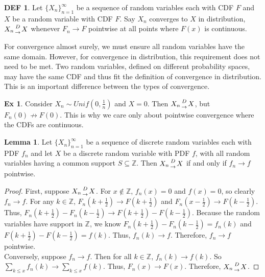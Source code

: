 \documentclass{article}
\theoremstyle{definition}\newtheorem{definition}{DEF}
\theoremstyle{definition}\newtheorem{example}{Ex}
\theoremstyle{lemma}\newtheorem{lemma}{Lemma}
\theoremstyle{corrolary}\newtheorem{corrolary}{Cor}
\begin{document}
\begin{definition}
Let $\{X_n\}_{n=1}^\infty$ be a sequence of random variables each with CDF $F$ and $X$ be a random variable with CDF $F$.
Say $X_n$ converges to $X$ in distribution, $X_n {D \atop \rightarrow} X$ whenever $F_n \rightarrow F$ pointwise at all points where $F(x)$ is continuous.
\end{definition}

For convergence almost surely, we must ensure all random variables have the same domain.
However, for convergence in distribution, this requirement does not need to be met.
Two random variables, defined on different probability spaces, may have the same CDF and thus fit the definition of convergence in distribution.
This is an important difference between the types of convergence.\\

\begin{example}
Consider $X_n \sim Unif(0,\frac{1}{n})$ and $X=0$.
Then $X_n {D\atop \rightarrow} X$, but $F_n(0) \nrightarrow F(0)$.
This is why we care only about pointwise convergence where the CDFs are continuous.
\end{example}

\begin{lemma}
Let $\{X_n \}_{n=1}^\infty$ be a sequence of discrete random variables each with PDF $f_n$ and let $X$ be a discrete random variable with PDF $f$, with all random variables having a common support $S\subseteq \mathbb{Z}$.
Then $X_n {D \atop \rightarrow} X$ if and only if $f_n \rightarrow f$ pointwise.
\end{lemma}
\begin{proof}
First, suppose $X_n {D \atop \rightarrow} X$.
For $x \notin \mathbb{Z}$, $f_n (x)=0$ and $f(x)=0$, so clearly $f_n \rightarrow f$.
For any $k \in \mathbb{Z}$, $F_n(k+\frac{1}{2}) \rightarrow F(k+\frac{1}{2})$ and $F_n(x-\frac{1}{2}) \rightarrow F(k-\frac{1}{2})$.
Thus, $F_n(k+\frac{1}{2}) - F_n(k-\frac{1}{2}) \rightarrow F(k+\frac{1}{2}) - F(k-\frac{1}{2})$.
Because the random variables have support in $\mathbb{Z}$, we know $F_n(k+\frac{1}{2})-F_n(k-\frac{1}{2})=f_n(k)$ and $F(k+\frac{1}{2})-F(k-\frac{1}{2})=f(k)$.
Thus, $f_n(k) \rightarrow f$.
Therefore, $f_n \rightarrow f$ pointwise.\\
Conversely, suppose $f_n\rightarrow f$.
Then for all $k\in \mathbb{Z}$, $f_n(k)\rightarrow f(k)$.
So $\sum_{k \leq x} f_n(k) \rightarrow \sum_{k \leq x} f(k)$.
Thus, $F_n(x)\rightarrow F(x)$.
Therefore, $X_n {D \atop \rightarrow} X$.
\end{proof}
\end{document}
